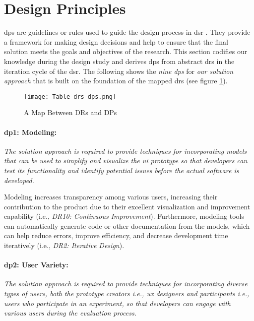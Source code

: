 \section{Design Principles}
\label{design:section:designprinciple}
\ac{dp}s are guidelines or rules used to guide the design process in \ac{dsr} \cite{misc:dsr:henver}. 
They provide a framework for making design decisions \cite{paper:designprinciple:gregor} and help to ensure that the final solution meets the goals and objectives of the research. 
This section codifies our knowledge during the design study and derives \ac{dp}s from abstract \ac{dr}s in the iteration cycle of the \ac{dsr}.
The following shows the \textit{nine \ac{dp}s} for \textit{our solution approach} that is built on the foundation of the mapped \ac{dr}s (see figure \ref{fig:design:table-drs-dps}). 
\begin{figure}[htbp!]
  \centering    
  \texttt{[image: Table-drs-dps.png]}
  \caption[A Map Between DRs and DPs]{A Map Between DRs and DPs}
  \label{fig:design:table-drs-dps}
\end{figure}
\clearpage

\paragraph{\ac{dp}1: Modeling:} \textit{The solution approach is required to provide techniques for incorporating models that can be used to simplify and visualize the \ac{ui} prototype so that developers can test its functionality and identify potential issues before the actual software is developed.}

Modeling increases transparency among various users, increasing their contribution to the product due to their excellent visualization and improvement capability (i.e., \textit{DR10: Continuous Improvement}).
Furthermore, modeling tools can automatically generate code or other documentation from the models, which can help reduce errors, improve efficiency, and decrease development time iteratively (i.e., \textit{DR2: Iterative Design}).

\paragraph{\ac{dp}2: User Variety:} \textit{The solution approach is required to provide techniques for incorporating diverse types of users, both the prototype creators i.e., \ac{ux} designers and participants i.e., users who participate in an experiment, so that developers can engage with various users during the evaluation process.}

